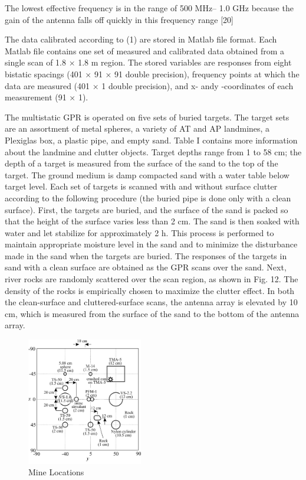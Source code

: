 \documentclass[conference]{IEEEtran}
\begin{document}
The lowest effective frequency is in the range of 500 MHz–
1.0 GHz because the gain of the antenna falls off quickly in this
frequency range [20]


The data calibrated according to (1) are stored in Matlab
file format. Each Matlab file contains one set of measured and
calibrated data obtained from a single scan of 1.8 × 1.8 m
region. The stored variables are responses from eight bistatic
spacings (401 × 91 × 91 double precision), frequency points at
which the data are measured (401 × 1 double precision), and
x- andy -coordinates of each measurement (91 × 1).


The multistatic GPR is operated on five sets of buried targets.
The target sets are an assortment of metal spheres, a variety
of AT and AP landmines, a Plexiglas box, a plastic pipe,
and empty sand. Table I contains more information about the
landmine and clutter objects. Target depths range from 1 to
58 cm; the depth of a target is measured from the surface of
the sand to the top of the target. The ground medium is damp
compacted sand with a water table below target level.
Each set of targets is scanned with and without surface clutter
according to the following procedure (the buried pipe is done
only with a clean surface). First, the targets are buried, and
the surface of the sand is packed so that the height of the
surface varies less than 2 cm. The sand is then soaked with
water and let stabilize for approximately 2 h. This process is
performed to maintain appropriate moisture level in the sand
and to minimize the disturbance made in the sand when the
targets are buried. The responses of the targets in sand with
a clean surface are obtained as the GPR scans over the sand.
Next, river rocks are randomly scattered over the scan region,
as shown in Fig. 12. The density of the rocks is empirically
chosen to maximize the clutter effect. In both the clean-surface
and cluttered-surface scans, the antenna array is elevated by
10 cm, which is measured from the surface of the sand to the
bottom of the antenna array.

 \begin{figure}
\centering
\label{fig:minloc}
\includegraphics[width=0.45\textwidth]{images/MineLocations.jpg}
 \caption{Mine Locations}
\end{figure}
\end{document}
